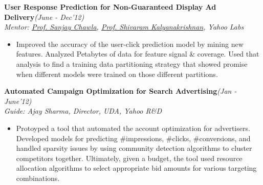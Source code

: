 \newpage
\textsf{\textbf{User Response Prediction for Non-Guaranteed Display Ad Delivery}}\hfill\textit{\small(June - Dec'12)}
\\ {\textit{Mentor: \href{http://www.pmg.it.usyd.edu.au/}{Prof. Sanjay Chawla}, \href{https://www.cse.iitb.ac.in/~shivaram/}{Prof. Shivaram Kalyanakrishnan}, Yahoo Labs}} \hfill{}
\normalsize
\begin{itemize}[leftmargin=*]\compresslist
    \item[] Improved the accuracy of the user-click prediction model by mining new features. Analyzed Petabytes of data for feature signal \& coverage. Used that analysis to find a training data partitioning strategy that showed promise when different models were trained on those different partitions.
\end{itemize}

\textsf{\textbf{Automated Campaign Optimization for Search Advertising}}\hfill\textit{\small(Jan - June'12)}
\\ {\textit{Guide: Ajay Sharma, Director, UDA, Yahoo R\&D}} \hfill{}
\normalsize
\begin{itemize}[leftmargin=*]\compresslist
    \item[] Protoyped a tool that automated the account optimization for advertisers. Developed models for predicting \#impressions, \#clicks, \#conversions, and handled sparsity issues by using community detection algorithms to cluster competitors together. Ultimately, given a budget, the tool used resource allocation algorithms to select appropriate bid amounts for various targeting combinations.
\end{itemize}


